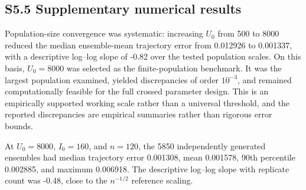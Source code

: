 \documentclass[11pt]{article}
\begin{document}
\subsection*{S5.5 Supplementary numerical results}
Population-size convergence was systematic: increasing $U_0$ from 500 to 8000 reduced the median ensemble-mean trajectory error from 0.012926 to 0.001337, with a descriptive log--log slope of -0.82 over the tested population scales. On this basis, $U_0=8000$ was selected as the finite-population benchmark. It was the largest population examined, yielded discrepancies of order $10^{-3}$, and remained computationally feasible for the full crossed parameter design. This is an empirically supported working scale rather than a universal threshold, and the reported discrepancies are empirical summaries rather than rigorous error bounds.

At $U_0=8000$, $I_0=160$, and $n=120$, the 5850 independently generated ensembles had median trajectory error 0.001308, mean 0.001578, 90th percentile 0.002885, and maximum 0.006918. The descriptive log--log slope with replicate count was -0.48, close to the $n^{-1/2}$ reference scaling.
\end{document}
